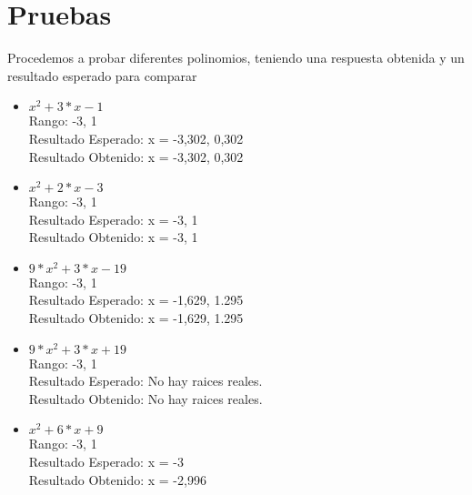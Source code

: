 \documentclass[12pt,journal,compsoc]{IEEEtran}
\begin{document}
\section{Pruebas}
Procedemos a probar diferentes polinomios, teniendo una respuesta obtenida y un resultado esperado para comparar
\begin{itemize}
	\item $ x^2 + 3*x - 1$ 
    \\Rango: -3, 1
    \\Resultado Esperado: x = -3,302, 0,302
    \\Resultado Obtenido: x = -3,302, 0,302
    \\ \item $x^2 + 2*x - 3$
    \\Rango: -3, 1
    \\Resultado Esperado: x = -3, 1
    \\Resultado Obtenido: x = -3, 1
    \\ \item $9*x^2 + 3*x - 19$
    \\Rango: -3, 1
    \\Resultado Esperado: x = -1,629, 1.295
    \\Resultado Obtenido: x = -1,629, 1.295
    \\ \item $9*x^2 + 3*x + 19$
    \\Rango: -3, 1
    \\Resultado Esperado: No hay raices reales.
    \\Resultado Obtenido: No hay raices reales.
    \\ \item $x^2 + 6*x + 9$
    \\Rango: -3, 1
    \\Resultado Esperado: x = -3
    \\Resultado Obtenido: x = -2,996

    
\end{itemize}
\end{document}

